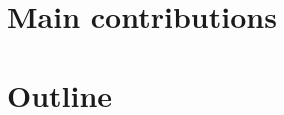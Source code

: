 
\section{Main contributions}\label{sec:introduction-contributions}

\section{Outline}\label{sec:introduction-outline}
